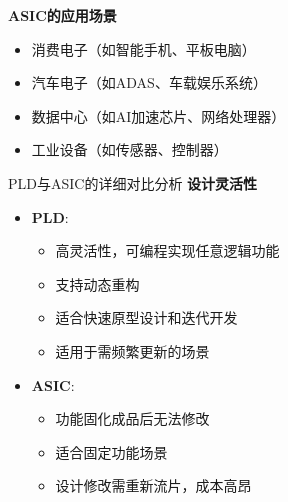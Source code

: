 \documentclass[
  ignorenonframetext,
  chinese,
]{beamer}
\providecommand{\tightlist}{%
  \setlength{\itemsep}{0pt}\setlength{\parskip}{0pt}}
\begin{document}
\begin{frame}
\begin{block}{\textbf{ASIC的应用场景}}
\label{asicux7684ux5e94ux7528ux573aux666f}
\begin{itemize}
\tightlist
\item
  消费电子（如智能手机、平板电脑）\\
\item
  汽车电子（如ADAS、车载娱乐系统）\\
\item
  数据中心（如AI加速芯片、网络处理器）\\
\item
  工业设备（如传感器、控制器）
\end{itemize}
\end{block}
\end{frame}

\begin{frame}
\begin{block}{PLD与ASIC的详细对比分析}
\label{pldux4e0easicux7684ux8be6ux7ec6ux5bf9ux6bd4ux5206ux6790}
\textbf{设计灵活性}

\begin{itemize}
\tightlist
\item
  \textbf{PLD}:

  \begin{itemize}
  \tightlist
  \item
    高灵活性，可编程实现任意逻辑功能\\
  \item
    支持动态重构\\
  \item
    适合快速原型设计和迭代开发\\
  \item
    适用于需频繁更新的场景\\
  \end{itemize}
\item
  \textbf{ASIC}:

  \begin{itemize}
  \tightlist
  \item
    功能固化成品后无法修改\\
  \item
    适合固定功能场景\\
  \item
    设计修改需重新流片，成本高昂
  \end{itemize}
\end{itemize}
\end{block}
\end{frame}
\end{document}
